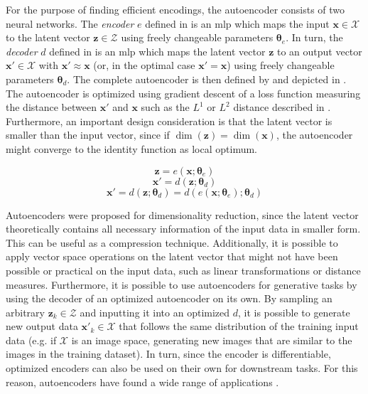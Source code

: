 For the purpose of finding efficient encodings, the autoencoder consists of two neural networks. The \emph{encoder} $e$ defined in  is an \gls{mlp} which maps the input $\mathbf{x}\in\mathcal{X}$ to the latent vector $\mathbf{z}\in\mathcal{Z}$ using freely changeable parameters $\boldsymbol{\theta}_e$. In turn, the \emph{decoder} $d$ defined in  is an \gls{mlp} which maps the latent vector $\mathbf{z}$ to an output vector $\mathbf{x'}\in\mathcal{X}$ with $\mathbf{x'}\approx\mathbf{x}$ (or, in the optimal case $\mathbf{x'}=\mathbf{x}$) using freely changeable parameters $\boldsymbol{\theta}_d$. The complete autoencoder is then defined by  and depicted in . The autoencoder is optimized using gradient descent of a loss function measuring the distance between $\mathbf{x}'$ and $\mathbf{x}$ such as the $L^1$ or $L^2$ distance described in . Furthermore, an important design consideration is that the latent vector is smaller than the input vector, since if $\dim(\mathbf{z})=\dim(\mathbf{x})$, the autoencoder might converge to the identity function as local optimum.


\begin{equation}
\label{eq:autoencoder.enc}
    \mathbf{z}=e(\mathbf{x};\boldsymbol{\theta}_e)
\end{equation}\begin{equation}
\label{eq:autoencoder.dec}
    \mathbf{x'}=d(\mathbf{z};\boldsymbol{\theta}_d)
\end{equation}
\begin{equation}
\label{eq:autoencoder}
    \mathbf{x'}=d(\mathbf{z};\boldsymbol{\theta}_d)=d(e(\mathbf{x};\boldsymbol{\theta}_e);\boldsymbol{\theta}_d)
\end{equation}

Autoencoders were proposed for dimensionality reduction, since the latent vector theoretically contains all necessary information of the input data in smaller form. This can be useful as a compression technique. Additionally, it is possible to apply vector space operations on the latent vector that might not have been possible or practical on the input data, such as linear transformations or distance measures. Furthermore, it is possible to use autoencoders for generative tasks by using the decoder of an optimized autoencoder on its own. By sampling an arbitrary $\mathbf{z}_k\in\mathcal{Z}$ and inputting it into an optimized $d$, it is possible to generate new output data $\mathbf{x}'_k\in\mathcal{X}$ that follows the same distribution of the training input data (e.g. if $\mathcal{X}$ is an image space, generating new images that are similar to the images in the training dataset). In turn, since the encoder is differentiable, optimized encoders can also be used on their own for downstream tasks. For this reason, autoencoders have found a wide range of applications \citep{DBLP:conf/ssst/ChoMBB14,DBLP:conf/iclr/TheisSCH17,doi:10.1126/science.1127647}.


